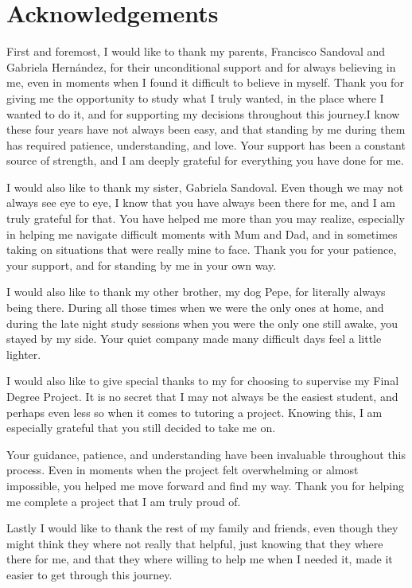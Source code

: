 \chapter*{Acknowledgements}

First and foremost, I would like to thank my parents, Francisco Sandoval and Gabriela Hernández,
for their unconditional support and for always believing in me, even in moments when I found it
difficult to believe in myself. Thank you for giving me the opportunity to study what I truly
wanted, in the place where I wanted to do it, and for supporting my decisions throughout this
journey.I know these four years have not always been easy, and that standing by me during them has
required patience, understanding, and love. Your support has been a constant source of strength,
and I am deeply grateful for everything you have done for me.

I would also like to thank my sister, Gabriela Sandoval. Even though we may not always see eye to
eye, I know that you have always been there for me, and I am truly grateful for that. You have
helped me more than you may realize, especially in helping me navigate difficult moments with Mum
and Dad, and in sometimes taking on situations that were really mine to face. Thank you for your
patience, your support, and for standing by me in your own way.

I would also like to thank my other brother, my dog Pepe, for literally always being there. During
all those times when we were the only ones at home, and during the late night study sessions when
you were the only one still awake, you stayed by my side. Your quiet company made many difficult
days feel a little lighter.

I would also like to give special thanks to my \tutor{} for choosing to supervise my Final Degree
Project. It is no secret that I may not always be the easiest student, and perhaps even less so
when it comes to tutoring a project. Knowing this, I am especially grateful that you still decided
to take me on.

Your guidance, patience, and understanding have been invaluable throughout this process. Even in
moments when the project felt overwhelming or almost impossible, you helped me move forward and
find my way. Thank you for helping me complete a project that I am truly proud of.

Lastly I would like to thank the rest of my family and friends, even though they might think they
where not really that helpful, just knowing that they where there for me, and that they where
willing to help me when I needed it, made it easier to get through this journey.